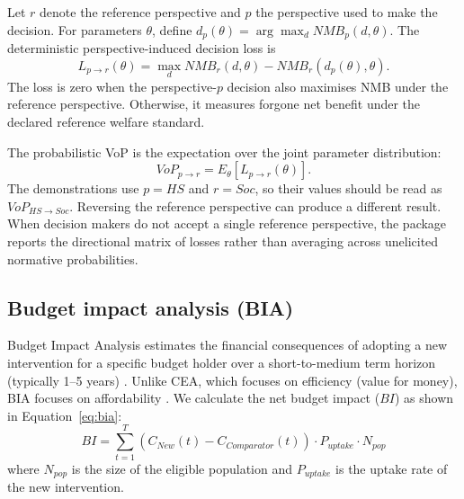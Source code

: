 \documentclass[article]{jss}
\begin{document}
Let $r$ denote the reference perspective and $p$ the perspective used to make
the decision. For parameters $\theta$, define
$d_p(\theta)=\arg\max_d NMB_p(d,\theta)$. The deterministic
perspective-induced decision loss is
\begin{equation} \label{eq:discordance}
L_{p\rightarrow r}(\theta)=
\max_d NMB_r(d,\theta)-NMB_r(d_p(\theta),\theta).
\end{equation}
The loss is zero when the perspective-$p$ decision also maximises NMB under
the reference perspective. Otherwise, it measures forgone net benefit under
the declared reference welfare standard.

The probabilistic VoP is the expectation over the joint parameter distribution:
\begin{equation} \label{eq:evop}
VoP_{p\rightarrow r}=E_{\theta}\left[L_{p\rightarrow r}(\theta)\right].
\end{equation}
The demonstrations use $p=HS$ and $r=Soc$, so their values should be read as
$VoP_{HS\rightarrow Soc}$. Reversing the reference perspective can produce a
different result. When decision makers do not accept a single reference
perspective, the package reports the directional matrix of losses rather than
averaging across unelicited normative probabilities.

\subsection{Budget impact analysis (BIA)}
Budget Impact Analysis estimates the financial consequences of adopting a new intervention for a specific budget holder over a short-to-medium term horizon (typically 1--5 years) \citep{sullivan2014}.
Unlike CEA, which focuses on efficiency (value for money), BIA focuses on affordability \citep{sullivan2014}.
We calculate the net budget impact ($BI$) as shown in Equation~\ref{eq:bia}:
\begin{equation} \label{eq:bia}
BI = \sum_{t=1}^{T} (C_{New}(t) - C_{Comparator}(t)) \cdot P_{uptake} \cdot N_{pop}
\end{equation}
where $N_{pop}$ is the size of the eligible population and $P_{uptake}$ is the uptake rate of the new intervention.
\end{document}
